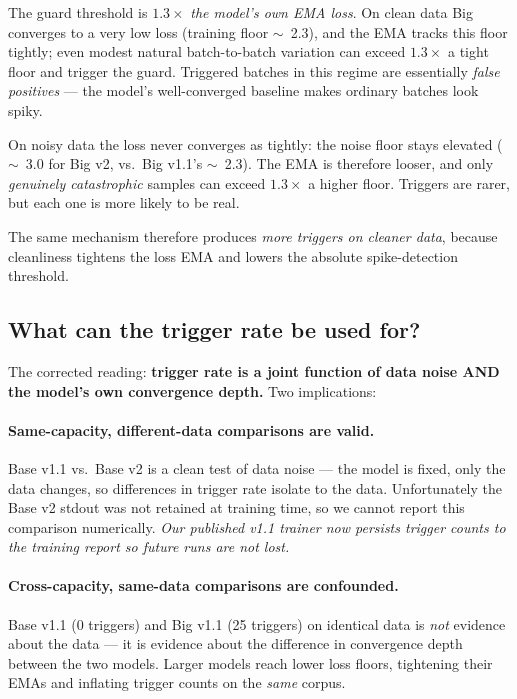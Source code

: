 The guard threshold is $1.3\times$ \emph{the model's own EMA loss}. On clean data Big converges to a very low loss (training floor $\sim$~2.3), and the EMA tracks this floor tightly; even modest natural batch-to-batch variation can exceed $1.3\times$ a tight floor and trigger the guard. Triggered batches in this regime are essentially \emph{false positives} --- the model's well-converged baseline makes ordinary batches look spiky.

On noisy data the loss never converges as tightly: the noise floor stays elevated ($\sim$~3.0 for Big v2, vs.\ Big v1.1's $\sim$~2.3). The EMA is therefore looser, and only \emph{genuinely catastrophic} samples can exceed $1.3\times$ a higher floor. Triggers are rarer, but each one is more likely to be real.

The same mechanism therefore produces \emph{more triggers on cleaner data}, because cleanliness tightens the loss EMA and lowers the absolute spike-detection threshold.

\subsection{What can the trigger rate be used for?}

The corrected reading: \textbf{trigger rate is a joint function of data noise AND the model's own convergence depth.} Two implications:

\paragraph{Same-capacity, different-data comparisons are valid.} Base v1.1 vs.\ Base v2 is a clean test of data noise --- the model is fixed, only the data changes, so differences in trigger rate isolate to the data. Unfortunately the Base v2 stdout was not retained at training time, so we cannot report this comparison numerically. \emph{Our published v1.1 trainer now persists trigger counts to the training report so future runs are not lost.}

\paragraph{Cross-capacity, same-data comparisons are confounded.} Base v1.1 (0 triggers) and Big v1.1 (25 triggers) on identical data is \emph{not} evidence about the data --- it is evidence about the difference in convergence depth between the two models. Larger models reach lower loss floors, tightening their EMAs and inflating trigger counts on the \emph{same} corpus.

